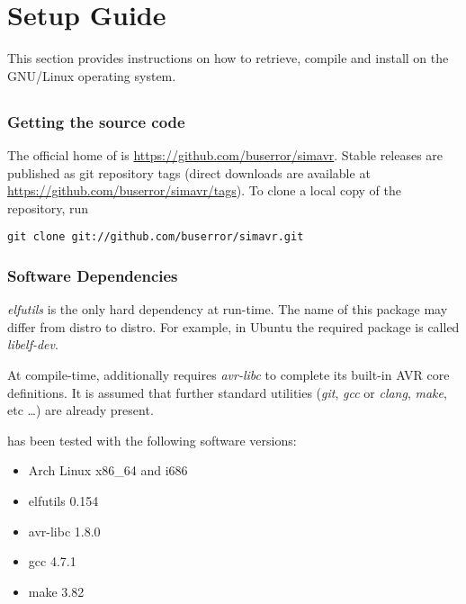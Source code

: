 \chapter{Setup Guide} \label{chapter:setup}

This section provides instructions on how to retrieve, compile and install
\simavr on the GNU/Linux operating system.

\section{\simavr} \label{section:setup_simavr}

\subsection{Getting the source code}

The official home of \simavr is \url{https://github.com/buserror/simavr}.
Stable releases are published as git repository tags (direct downloads are
available at \url{https://github.com/buserror/simavr/tags}). To clone a local
copy of the repository, run

\begin{verbatim}
git clone git://github.com/buserror/simavr.git
\end{verbatim}

\subsection{Software Dependencies}

\emph{elfutils} is the only hard dependency at run-time. The name of this
package may differ from distro to distro. For example, in Ubuntu the required
package is called \emph{libelf-dev}.

At compile-time, \simavr additionally requires \emph{avr-libc} to complete its
built-in AVR core definitions. It is assumed that further standard
utilities (\emph{git}, \emph{gcc} or \emph{clang}, \emph{make}, etc \ldots) are
already present.

\simavr has been tested with the following software versions:

\begin{itemize}
\item Arch Linux x86\_64 and i686
\item elfutils 0.154
\item avr-libc 1.8.0
\item gcc 4.7.1
\item make 3.82
\end{itemize}


